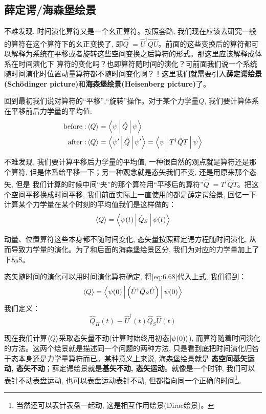 \documentclass[a4paper,zihao=-4,linespread=1]{ctexrep}
\begin{document}
    \subsection{薛定谔/海森堡绘景}
    不难发现, 时间演化算符又是一个幺正算符。按照套路, 我们现在应该去研究一般的算符在这个算符下的幺正变换了, 即$\hat Q^\prime=\hat{U}^\dagger\hat{Q}\hat{U}$。前面的这些变换后的算符都可以解释为系统在平移或者旋转这些空间变换之后算符的形式。那这里应该解释成体系在时间演化下
    算符的变化吗？也即算符随时间的演化？可前面我们说一个系统随时间演化时位置动量算符都不随时间变化啊？！这里我们就需要引入\textbf{薛定谔绘景(Sch\"odinger picture)}和\textbf{海森堡绘景(Heisenberg picture)}了。
    
    回到最初我们说对算符的“平移”,“旋转”操作。对于某个力学量$Q$, 我们要计算体系在平移前后力学量的平均值:
    \begin{align*}
        \text{before}:&\braket{Q}=\Braket{\psi|\hat{Q}|\psi}\\
        \text{after}:&\braket{Q}=\Braket{\psi^\prime|\hat{Q}|\psi^\prime}=\Braket{\psi|T^\dagger\hat{Q}T|\psi}
    \end{align*}
    
    不难发现, 我们要计算平移后力学量的平均值, 一种很自然的观点就是算符还是那个算符, 但是体系给平移一下；另一种观念就是态矢我们不变, 还是用原来那个态矢, 但是
    我们计算的时候中间“夹”的那个算符用“平移后的算符”$\hat{Q}^\prime=T^\dagger\hat{Q}T$。把这个空间平移换成时间平移, 我们前面实际上一直使用的都是薛定谔绘景, 
    回忆一下计算某个力学量在某个时刻的平均值我们是这样做的：
    \[\braket{Q}=\Braket{\psi(t)|\hat{Q}_S|\psi(t)}\]
    
    动量、位置算符这些本身都不随时间变化, 态矢量按照薛定谔方程随时间演化, 从而导致力学量的演化。为了和后面的海森堡绘景区分, 我们为对应的力学量加上了下标S。

    态矢随时间的演化可以用时间演化算符确定, 将\ref{eq:6.68}代入上式, 我们得到：
    \[\braket{Q}=\Braket{\psi(0)|\left(\hat{U}^\dagger\hat{Q}_S\hat{U}\right)|\psi(0)}\]
    我们定义：
    \begin{equation}
        \label{eq:6.71}
        \hat{Q}_H(t)\equiv\hat{U}^\dagger(t)\hat{Q}_S\hat{U}(t)
    \end{equation}
    
    现在我们计算$\braket{Q}$采取态矢量不动(计算时始终用初态$\ket{\psi(0)}$), 而算符随着时间演化的方法。这两个绘景就是描述同一个问题的两种方法, 只是看到底把时间演化归咎于态本身还是力学量算符而已。某种意义上来说, 海森堡绘景就是
    \textbf{态空间基矢运动, 态矢不动}；薛定谔绘景就是\textbf{基矢不动, 态矢运动}。就像是一个时钟, 我们可以表针不动表盘运动, 也可以表盘运动表针不动, 但都指向同一个正确的时间\footnote{当然还可以表针表盘一起动, 这是相互作用绘景(Dirac绘景)。}。
    
\end{document}
